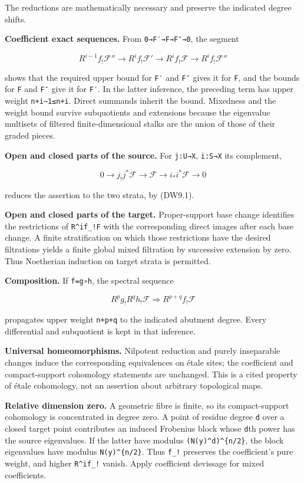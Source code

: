\documentclass[
]{report}
\begin{document}
The reductions are mathematically necessary and preserve the indicated
degree shifts.

\textbf{Coefficient exact sequences.} From \texttt{0→F′→F→F″→0}, the
segment

\[
R^{i-1}f_!\mathcal F''\to R^if_!\mathcal F'
\to R^if_!\mathcal F\to R^if_!\mathcal F''
\tag{DW9.1}
\]

shows that the required upper bound for \texttt{F′} and \texttt{F″}
gives it for \texttt{F}, and the bounds for \texttt{F} and \texttt{F″}
give it for \texttt{F′}. In the latter inference, the preceding term has
upper weight \texttt{n+i−1≤n+i}. Direct summands inherit the bound.
Mixedness and the weight bound survive subquotients and extensions
because the eigenvalue multisets of filtered finite-dimensional stalks
are the union of those of their graded pieces.

\textbf{Open and closed parts of the source.} For \texttt{j:U→X},
\texttt{i:S→X} its complement,

\[
0\to j_!j^*\mathcal F\to\mathcal F\to i_*i^*\mathcal F\to0
\tag{DW9.2}
\]

reduces the assertion to the two strata, by (DW9.1).

\textbf{Open and closed parts of the target.} Proper-support base change
identifies the restrictions of \texttt{R\^{}if\_!F} with the
corresponding direct images after each base change. A finite
stratification on which those restrictions have the desired filtrations
yields a finite global mixed filtration by successive extension by zero.
Thus Noetherian induction on target strata is permitted.

\textbf{Composition.} If \texttt{f=g∘h}, the spectral sequence

\[
R^pg_!R^qh_!\mathcal F\Longrightarrow R^{p+q}f_!\mathcal F
\tag{DW9.3}
\]

propagates upper weight \texttt{n+p+q} to the indicated abutment degree.
Every differential and subquotient is kept in that inference.

\textbf{Universal homeomorphisms.} Nilpotent reduction and purely
inseparable changes induce the corresponding equivalences on étale
sites; the coefficient and compact-support cohomology statements are
unchanged. This is a cited property of étale cohomology, not an
assertion about arbitrary topological maps.

\textbf{Relative dimension zero.} A geometric fibre is finite, so its
compact-support cohomology is concentrated in degree zero. A point of
residue degree \texttt{d} over a closed target point contributes an
induced Frobenius block whose \texttt{d}th power has the source
eigenvalues. If the latter have modulus \texttt{(N(y)\^{}d)\^{}\{n/2\}},
the block eigenvalues have modulus \texttt{N(y)\^{}\{n/2\}}. Thus
\texttt{f\_!} preserves the coefficient's pure weight, and higher
\texttt{R\^{}if\_!} vanish. Apply coefficient devissage for mixed
coefficients.
\end{document}
